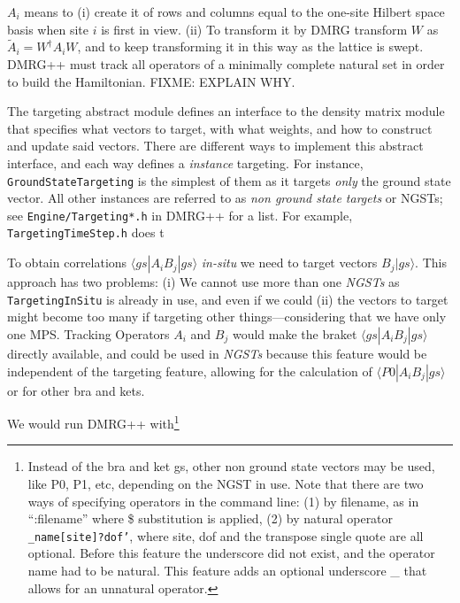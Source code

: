 \documentclass{article}
\begin{document}
$A_i$ means to (i) create it of rows and columns equal to the 
one-site Hilbert space basis when
site $i$ is first in view. (ii) To transform it by DMRG transform $W$ as
$\tilde{A}_i = W^\dagger A_i W$, and to keep transforming it in this way
as the lattice is swept. DMRG++ must track all operators
of a minimally complete
natural set in order to build the Hamiltonian. FIXME: EXPLAIN WHY.

The targeting abstract module defines an interface to the
density matrix module that specifies what vectors to target, with what
weights, and how to construct and update said vectors.
There are different ways to implement this abstract interface, and each
way defines a \emph{instance} targeting. For instance, \texttt{GroundStateTargeting}
is the simplest of them as it targets \emph{only} the ground state vector.
All other instances are referred to as \emph{non ground state targets} or NGSTs; 
see \texttt{Engine/Targeting*.h} in DMRG++ for a list. For example, 
\texttt{TargetingTimeStep.h}
does t{}

 To obtain correlations $\langle gs| A_i B_j |gs\rangle$
\emph{in-situ} we need to target vectors $B_j |gs\rangle$.
This approach has two problems: (i) We cannot use more than one \emph{NGSTs}
as \texttt{TargetingInSitu} is already in use, and
even if we could (ii) the vectors to target might become too many if 
targeting other things---considering
that we have only one MPS. Tracking Operators $A_i$ and $B_j$ would make
the braket $\langle gs| A_i B_j |gs\rangle$ directly available, and could
be used in \emph{NGSTs} because this feature would be independent
of the targeting feature, allowing for the calculation of
 $\langle P0| A_i B_j |gs\rangle$ or for other bra and kets.

We would run DMRG++ with\footnote{Instead of the bra and ket gs, other
non ground state vectors may be used, like P0, P1, etc, depending on the
NGST in use. Note that there are two ways of specifying operators in
the command line: (1) by filename, as in ``:filename'' where \$ substitution
is applied, (2) by natural operator \texttt{\_name[site]?dof'}, where
site, dof and the transpose single quote are all optional. 
Before this feature the underscore did not exist, and the operator name
had to be natural. This feature
adds an optional underscore \_ that allows for an unnatural operator.}
\end{document}
